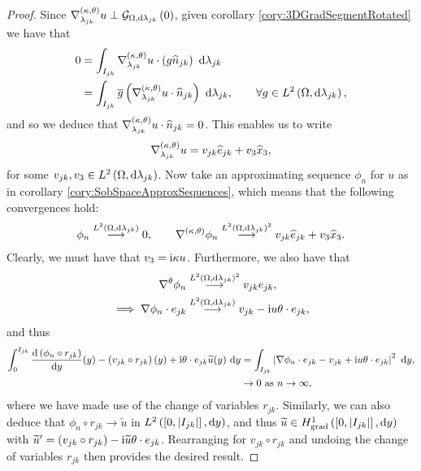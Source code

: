 \begin{proof}
	Since $\nabla^{\left( \kappa, \theta \right)}_{\lambda_{jk}}u \perp \mathcal{G}_{ \Omega, \mathrm{d}\lambda_{jk}}\left( 0 \right)$, given corollary \ref{cory:3DGradSegmentRotated} we have that
	\begin{align*}
		0 &= \int_{I_{jk}} \nabla^{\left( \kappa, \theta \right)}_{\lambda_{jk}}u\cdot\left( g\widehat{n}_{jk} \right)  \ \mathrm{d}\lambda_{jk} \\
		&= \int_{I_{jk}} \overline{g}\left( \nabla^{\left( \kappa, \theta \right)}_{\lambda_{jk}}u\cdot\widehat{n}_{jk} \right)  \ \mathrm{d}\lambda_{jk}, \qquad \forall g\in L^{2}\left( \Omega,\mathrm{d}\lambda_{jk} \right),
\end{align*}
	and so we deduce that $\nabla^{\left( \kappa, \theta \right)}_{\lambda_{jk}}u\cdot\widehat{n}_{jk} = 0$.
	This enables us to write
	\begin{align*}
		\nabla^{\left( \kappa, \theta \right)}_{\lambda_{jk}}u = v_{jk}\widehat{e}_{jk} + v_3\widehat{x}_3,
	\end{align*}
	for some $v_{jk},v_3\in L^{2}\left( \Omega,\mathrm{d}\lambda_{jk} \right)$.
	Now take an approximating sequence $\phi_n$ for $u$ as in corollary \ref{cory:SobSpaceApproxSequences}, which means that the following convergences hold:
	\begin{align*}
		\phi_n \overset{L^{2}\left( \Omega,\mathrm{d}\lambda_{jk} \right)}{\longrightarrow} 0, \qquad \nabla^{\left( \kappa, \theta \right)}\phi_n \overset{L^{2}\left( \Omega,\mathrm{d}\lambda_{jk} \right)^2}{\longrightarrow} v_{jk}\widehat{e}_{jk} + v_3\widehat{x}_3.
	\end{align*}
	Clearly, we must have that $v_3 = \mathrm{i}\kappa u$.
	Furthermore, we also have that
	\begin{align*}
		\nabla^{\theta}\phi_n &\overset{L^{2}\left( \Omega,\mathrm{d}\lambda_{jk} \right)^2}{\longrightarrow} v_{jk}e_{jk}, \\
		\implies \nabla\phi_n\cdot e_{jk} &\overset{L^{2}\left( \Omega,\mathrm{d}\lambda_{jk} \right)}{\longrightarrow} v_{jk} - \mathrm{i} u \theta\cdot e_{jk},
	\end{align*}
	and thus
	\begin{align*}
		\int_0^{I_{jk}} \diff{\bracs{\phi_n\circ r_{jk}}}{y}(y) - \bracs{v_{jk}\circ r_{jk}}(y) + \rmi\qm\cdot e_{jk}\widetilde{u}(y) \ \md y
		&= \integral{I_{jk}}{ \abs{ \grad\phi_n\cdot e_{jk} - v_{jk} + \rmi u \qm\cdot e_{jk} }^2 }{y}, \\
		&\rightarrow 0 \toInfty{n},
	\end{align*}
	where we have made use of the change of variables $r_{jk}$.
	Similarly, we can also deduce that $\phi_n\circ r_{jk} \rightarrow \widetilde{u}$ in $L^{2}\left( \left[ 0,\left\lvert I_{jk} \right\rvert \right],\mathrm{d}y \right)$, and thus $\widetilde{u}\in H^1_\mathrm{grad}\left( \left[ 0,\left\lvert I_{jk} \right\rvert \right], \mathrm{d}y \right)$ with $\widetilde{u}' = \left( v_{jk}\circ r_{jk} \right) - \mathrm{i}\widetilde{u}\theta\cdot e_{jk}$.
	Rearranging for $v_{jk}\circ r_{jk}$ and undoing the change of variables $r_{jk}$ then provides the desired result.
\end{proof}

